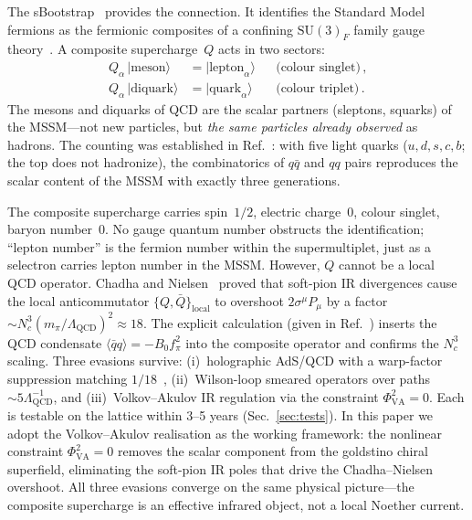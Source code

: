 \documentclass[aps,prd,twocolumn,showpacs,preprintnumbers,superscriptaddress]{revtex4-2}
\newcommand{\SU}{\mathrm{SU}}
\newcommand{\Lqcd}{\Lambda_{\mathrm{QCD}}}
\begin{document}
The sBootstrap~\cite{Rivero:2024} provides the connection.
It identifies the Standard Model fermions as the fermionic
composites of a confining $\SU(3)_F$ family gauge
theory~\cite{MasieroVeneziano:1985}.
A composite supercharge~$Q$ acts in two sectors:
\begin{align}
  Q_\alpha\,|\text{meson}\rangle &= |\text{lepton}_\alpha\rangle
  &&\text{(colour singlet)}\,,
  \label{eq:Q_meson}\\
  Q_\alpha\,|\text{diquark}\rangle &= |\text{quark}_\alpha\rangle
  &&\text{(colour triplet)}\,.
  \label{eq:Q_diquark}
\end{align}
The mesons and diquarks of QCD are the scalar partners
(sleptons, squarks) of the MSSM---not new particles, but
\emph{the same particles already observed} as hadrons.
The counting was established in Ref.~\cite{Rivero:2024}:
with five light quarks ($u,d,s,c,b$; the top does not
hadronize), the combinatorics of $q\bar q$ and $qq$ pairs
reproduces the scalar content of the MSSM with exactly
three generations.

The composite supercharge carries spin~$1/2$, electric
charge~$0$, colour singlet, baryon number~$0$.
No gauge quantum number obstructs the identification;
``lepton number'' is the fermion number within the
supermultiplet, just as a selectron carries lepton number
in the MSSM.
However, $Q$ cannot be a local QCD operator.
Chadha and Nielsen~\cite{ChadhaNielsen:1977} proved that
soft-pion IR divergences cause the local anticommutator
$\{Q,\bar Q\}_{\mathrm{local}}$ to overshoot
$2\sigma^\mu P_\mu$ by a factor
$\sim N_c^3(m_\pi/\Lqcd)^2 \approx 18$.
The explicit calculation (given in Ref.~\cite{v159}) inserts
the QCD condensate $\langle\bar q q\rangle = -B_0 f_\pi^2$
into the composite operator and confirms the $N_c^3$ scaling.
Three evasions survive: (i)~holographic AdS/QCD with a
warp-factor suppression matching $1/18$~\cite{Karch:2002},
(ii)~Wilson-loop smeared operators over paths
$\sim 5\Lqcd^{-1}$, and (iii)~Volkov--Akulov IR regulation
via the constraint $\Phi_{\mathrm{VA}}^2 = 0$.
Each is testable on the lattice within 3--5 years
(Sec.~\ref{sec:tests}).
In this paper we adopt the Volkov--Akulov realisation as the
working framework: the nonlinear constraint
$\Phi_{\mathrm{VA}}^2 = 0$ removes the scalar component from
the goldstino chiral superfield, eliminating the soft-pion IR
poles that drive the Chadha--Nielsen overshoot.
All three evasions converge on the same physical picture---the
composite supercharge is an effective infrared object, not a
local Noether current.
\end{document}
